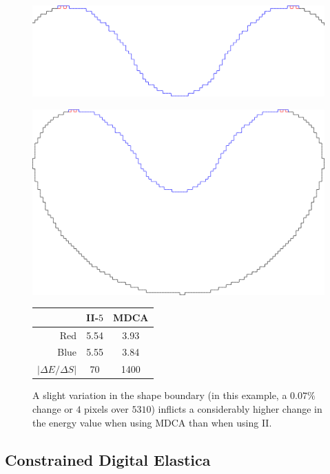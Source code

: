 \begin{figure}[]
\begin{minipage}[b]{0.6\textwidth}
\center
\includegraphics[scale=0.15]{figures/chapter5/mdca-sensitivity/closer-picture.pdf}
\end{minipage}%
\begin{minipage}[b]{0.4\textwidth}
\center
\includegraphics[scale=0.025]{figures/chapter5/mdca-sensitivity/big-picture.pdf}\\\vspace{2em}
\captionsetup{type=table}
\begin{tabular}{r|c|c}
& II-$5$ & MDCA \\
\hline
Red  & 5.54 & 3.93\\
Blue & 5.55 & 3.84\\
\hline
$| \Delta E / \Delta S |$ & 70 & 1400
\end{tabular}
\end{minipage}
\caption{A slight variation in the shape boundary (in this example, a $0.07\%$ change or $4$ pixels over $5310$) inflicts a considerably higher change in the energy value when using MDCA than when using II. }
\label{fig:mdca-sensitivity}
\end{figure}

\subsection{Constrained Digital Elastica}

